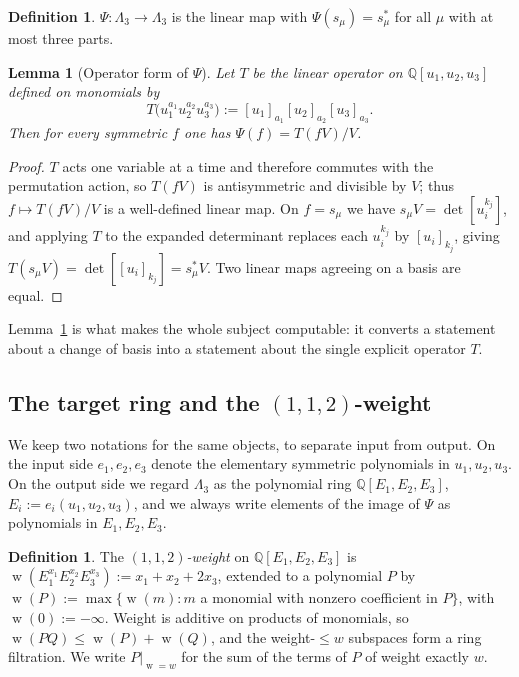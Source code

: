\documentclass[10pt]{article}
\theoremstyle{plain}
\newtheorem{lemma}[theorem]{Lemma}
\theoremstyle{definition}
\newtheorem{definition}[theorem]{Definition}
\newcommand{\bbQ}{\mathbb{Q}}
\newcommand{\Lam}{\Lambda_3}
\newcommand{\ffal}[2]{[#1]_{#2}}
\newcommand{\wt}{\operatorname{w}}
\begin{document}
\begin{definition}\label{def:psi}
$\Psi:\Lam\to\Lam$ is the linear map with $\Psi(s_\mu)=s^*_\mu$ for all $\mu$ with at most
three parts.
\end{definition}

\begin{lemma}[Operator form of $\Psi$]\label{lem:operator}
Let $T$ be the linear operator on $\bbQ[u_1,u_2,u_3]$ defined on monomials by
\[
 T\big(u_1^{a_1}u_2^{a_2}u_3^{a_3}\big):=\ffal{u_1}{a_1}\ffal{u_2}{a_2}\ffal{u_3}{a_3}.
\]
Then for every symmetric $f$ one has $\Psi(f)=T(fV)/V$.
\end{lemma}

\begin{proof}
$T$ acts one variable at a time and therefore commutes with the permutation action, so
$T(fV)$ is antisymmetric and divisible by $V$; thus $f\mapsto T(fV)/V$ is a well-defined
linear map. On $f=s_\mu$ we have $s_\mu V=\det[u_i^{k_j}]$, and applying $T$ to the expanded
determinant replaces each $u_i^{k_j}$ by $\ffal{u_i}{k_j}$, giving
$T(s_\mu V)=\det[\ffal{u_i}{k_j}]=s^*_\mu V$. Two linear maps agreeing on a basis are equal.
\end{proof}

Lemma~\ref{lem:operator} is what makes the whole subject computable: it converts a statement
about a change of basis into a statement about the single explicit operator $T$.

\subsection{The target ring and the $(1,1,2)$-weight}

We keep two notations for the same objects, to separate input from output. On the input side
$e_1,e_2,e_3$ denote the elementary symmetric polynomials in $u_1,u_2,u_3$. On the output
side we regard $\Lam$ as the polynomial ring $\bbQ[E_1,E_2,E_3]$, $E_i:=e_i(u_1,u_2,u_3)$,
and we always write elements of the image of $\Psi$ as polynomials in $E_1,E_2,E_3$.

\begin{definition}\label{def:weight}
The \emph{$(1,1,2)$-weight} on $\bbQ[E_1,E_2,E_3]$ is
$\wt(E_1^{x_1}E_2^{x_2}E_3^{x_3}):=x_1+x_2+2x_3$, extended to a polynomial $P$ by
$\wt(P):=\max\{\wt(m): m$ a monomial with nonzero coefficient in $P\}$, with
$\wt(0):=-\infty$. Weight is additive on products of monomials, so
$\wt(PQ)\le \wt(P)+\wt(Q)$, and the weight-$\le w$ subspaces form a ring filtration. We
write $P|_{\wt=w}$ for the sum of the terms of $P$ of weight exactly $w$.
\end{definition}
\end{document}
